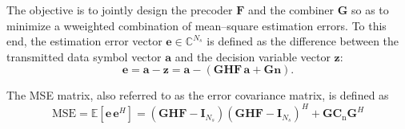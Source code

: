 The objective is to jointly design the precoder $\mathbf{F}$ and the combiner $\mathbf{G}$ so as to minimize a wweighted combination of mean--square estimation errors.
To this end, the estimation error vector $\mathbf{e} \in \mathbb{C}^{N_s}$ is defined as the difference between the transmitted data symbol vector $\mathbf{a}$ and the decision variable vector $\mathbf{z}$:
\begin{equation}
\label{eq:error_vector}
    \mathbf{e} 
    = \mathbf{a} - \mathbf{z} 
    = \mathbf{a} - (\mathbf{G}\mathbf{H}\mathbf{F}\,\mathbf{a} + \mathbf{G}\mathbf{n}).
\end{equation}

The \ac{MSE} matrix, also referred to as the error covariance matrix, is defined as
\begin{equation}
\label{eq:mse_matrix}
    \text{MSE} 
    = \mathbb{E}\!\left[\mathbf{e}\, \mathbf{e}^H\right]
    = (\mathbf{G}\mathbf{H}\mathbf{F} - \mathbf{I}_{N_s})(\mathbf{G}\mathbf{H}\mathbf{F} - \mathbf{I}_{N_s})^H + \mathbf{G} \mathbf{C}_{\mathrm{n}} \mathbf{G}^H
\end{equation}
